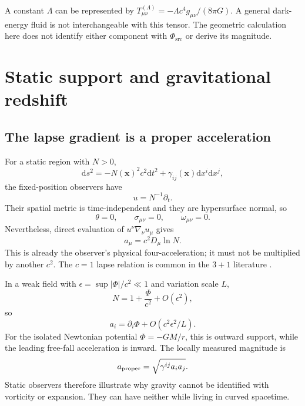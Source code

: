 \documentclass[11pt,oneside]{report}
\newcommand{\PhiSrc}{\Phi_{\mathrm{src}}}
\newcommand{\Ph}{\Phi}
\newcommand{\dd}{\mathrm d}
\theoremstyle{remark}
\numberwithin{definition}{chapter}
\numberwithin{proposition}{chapter}
\numberwithin{remark}{chapter}
\begin{document}
A constant $\Lambda$ can be represented by $T^{(\Lambda)}_{\mu\nu}=-\Lambda c^4g_{\mu\nu}/(8\pi G)$. A general dark-energy fluid is not interchangeable with this tensor. The geometric calculation here does not identify either component with $\PhiSrc$ or derive its magnitude.

\section{Static support and gravitational redshift}
\subsection{The lapse gradient is a proper acceleration}
For a static region with $N>0$,
\begin{equation}
\dd s^2=-N(\mathbf x)^2c^2\dd t^2+\gamma_{ij}(\mathbf x)\dd x^i\dd x^j,
\label{geometry:eq:staticmetric}
\end{equation}
the fixed-position observers have
\begin{equation}
u=N^{-1}\partial_t.
\label{geometry:eq:staticu}
\end{equation}
Their spatial metric is time-independent and they are hypersurface normal, so
\begin{equation}
\theta=0,\qquad \sigma_{\mu\nu}=0,\qquad \omega_{\mu\nu}=0.
\label{geometry:eq:statickinematics}
\end{equation}
Nevertheless, direct evaluation of $u^\nu\nabla_\nu u_\mu$ gives
\begin{equation}
\boxed{a_\mu=c^2D_\mu\ln N.}
\label{geometry:eq:staticacceleration}
\end{equation}
This is already the observer's physical four-acceleration; it must not be multiplied by another $c^2$. The $c=1$ lapse relation is common in the $3+1$ literature \parencite{Gourgoulhon2010}.

In a weak field with $\epsilon=\sup|\Ph|/c^2\ll1$ and variation scale $L$,
\begin{equation}
N=1+\frac{\Ph}{c^2}+O(\epsilon^2),
\label{geometry:eq:lapseweakfield}
\end{equation}
so
\begin{equation}
a_i=\partial_i\Ph+O(c^2\epsilon^2/L).
\label{geometry:eq:weakfieldacceleration}
\end{equation}
For the isolated Newtonian potential $\Ph=-GM/r$, this is outward support, while the leading free-fall acceleration is inward. The locally measured magnitude is
\begin{equation}
a_{\rm proper}=\sqrt{\gamma^{ij}a_i a_j}.
\label{geometry:eq:physicalacceleration}
\end{equation}
Static observers therefore illustrate why gravity cannot be identified with vorticity or expansion. They can have neither while living in curved spacetime.
\end{document}
